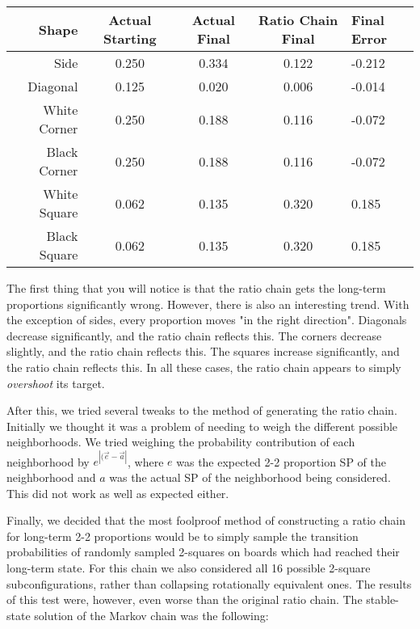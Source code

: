 \documentclass[12pt]{article}
\theoremstyle{definition}
\theoremstyle{remark}
\theoremstyle{remark}
\begin{document}
\begin{table}[H]
\begin{tabular}{r|c c c | l}
  Shape & Actual Starting & Actual Final & Ratio Chain Final & Final Error \\ \hline
  Side & 0.250 & 0.334 & 0.122 & -0.212 \\
  Diagonal & 0.125 & 0.020 & 0.006 & -0.014 \\
  White Corner & 0.250 & 0.188 & 0.116 & -0.072 \\
  Black Corner & 0.250 & 0.188 & 0.116 & -0.072 \\
  White Square & 0.062 & 0.135 & 0.320 & 0.185 \\
  Black Square & 0.062 & 0.135 & 0.320 & 0.185 \\
\end{tabular}
\caption{}
\end{table}
\par The first thing that you will notice is that the ratio chain gets the long-term proportions significantly wrong. However, there is also an interesting trend. With the exception of sides, every proportion moves "in the right direction". Diagonals decrease significantly, and the ratio chain reflects this. The corners decrease slightly, and the ratio chain reflects this. The squares increase significantly, and the ratio chain reflects this. In all these cases, the ratio chain appears to simply \emph{overshoot} its target.

\par
After this, we tried several tweaks to the method of generating the ratio chain. Initially we thought it was a problem of needing to weigh the different possible neighborhoods. We tried weighing the probability contribution of each neighborhood by $e^{|(\vec{e}-\vec{a}|}$, where $e$ was the expected 2-2 proportion SP of the neighborhood and $a$ was the actual SP of the neighborhood being considered. This did not work as well as expected either.

\par
Finally, we decided that the most foolproof method of constructing a ratio chain for long-term 2-2 proportions would be to simply sample the transition probabilities of randomly sampled 2-squares on boards which had reached their long-term state. For this chain we also considered all 16 possible 2-square subconfigurations, rather than collapsing rotationally equivalent ones. The results of this test were, however, even worse than the original ratio chain. The stable-state solution of the Markov chain was the following:
\end{document}
